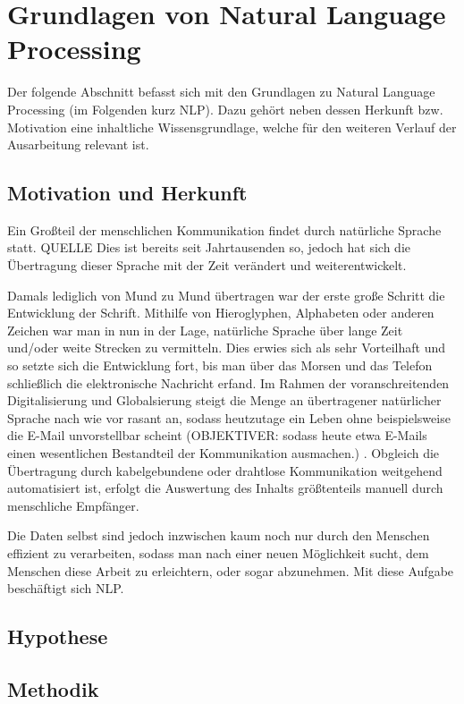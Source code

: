 \documentclass[12pt]{paper}
\begin{document}
\section{Grundlagen von Natural Language Processing}
Der folgende Abschnitt befasst sich mit den Grundlagen zu Natural Language Processing (im Folgenden kurz NLP). Dazu gehört neben dessen Herkunft bzw. Motivation eine inhaltliche Wissensgrundlage, welche für den weiteren Verlauf der Ausarbeitung relevant ist. 

\subsection{Motivation und Herkunft}
Ein Großteil der menschlichen Kommunikation findet durch natürliche Sprache statt. QUELLE Dies ist bereits seit Jahrtausenden so, jedoch hat sich die Übertragung dieser Sprache mit der Zeit verändert und weiterentwickelt. 

Damals lediglich von Mund zu Mund übertragen war der erste große Schritt die Entwicklung der Schrift. Mithilfe von Hieroglyphen, Alphabeten oder anderen Zeichen war man in nun in der Lage, natürliche Sprache über lange Zeit und/oder weite Strecken zu vermitteln. Dies erwies sich als sehr Vorteilhaft und so setzte sich die Entwicklung fort, bis man über das Morsen und das Telefon schließlich die elektronische Nachricht erfand. 
Im Rahmen der voranschreitenden Digitalisierung und Globalsierung steigt die Menge an übertragener natürlicher Sprache nach wie vor rasant an, sodass heutzutage ein Leben ohne beispielsweise die E-Mail unvorstellbar scheint (OBJEKTIVER: sodass heute etwa E-Mails einen wesentlichen Bestandteil der Kommunikation ausmachen.) . Obgleich die Übertragung durch kabelgebundene oder drahtlose Kommunikation weitgehend automatisiert ist, erfolgt die Auswertung des Inhalts größtenteils manuell durch menschliche Empfänger.

Die Daten selbst sind jedoch inzwischen kaum noch nur durch den Menschen effizient zu verarbeiten, sodass man nach einer neuen Möglichkeit sucht, dem Menschen diese Arbeit zu erleichtern, oder sogar abzunehmen. Mit diese Aufgabe beschäftigt sich NLP. 

\subsection{Hypothese}

\subsection{Methodik}
\end{document}
